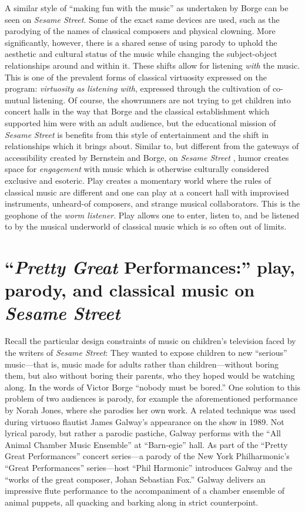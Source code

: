 \documentclass[12pt,letterpaper]{article}
\newcommand{\ses}{\textit{Sesame Street }}
\begin{document}
	A similar style of ``making fun with the music'' as undertaken by 
	Borge can be seen on \textit{Sesame Street}. Some of the exact same 
	devices are used, such as the parodying of the names of classical 
	composers and physical clowning. More significantly, however, there is 
	a shared sense of using
	parody to uphold the aesthetic and cultural status of the music while
	changing the subject-object relationships around and within it. 
	These shifts allow for listening \textit{with} the music. This is one
	of the prevalent forms
	of classical virtuosity expressed on the program: \textit{virtuosity as 
	listening with}, expressed through the cultivation of co-mutual
	listening. Of course, the showrunners are not trying to
	get children into concert halls in the way that Borge and the
	classical establishment which supported him were with an adult 
	audience, but the educational mission of \ses
	is benefits from this style of entertainment and the shift in 
	relationships which it brings about. Similar to, but different from the
	gateways of
	accessibility created by Bernstein and Borge, on \ses, humor creates 
	space for \textit{engagement} with music which is otherwise culturally
	considered exclusive and esoteric. Play creates a momentary world 
	where the rules of classical music are different and one can play 
	at a concert hall with improvised instruments, unheard-of composers,
	and strange musical collaborators. This is the geophone of the
	\textit{worm listener}. Play allows one to enter, listen to, and be 
	listened to by the musical underworld of classical music which is so 
	often out of limits.

	\section*{``\textit{Pretty Great} Performances:'' play, parody, and 
	classical music on \ses}

	Recall the particular design constraints of music on children's
	television faced by the writers of \textit{Sesame Street}: 	
	They wanted to expose children to new ``serious'' music---that is, music
	made for adults rather than children---without boring
	them, but also without boring their parents, who they hoped would be 
	watching along. In the words of Victor Borge ``nobody must
	be bored.'' One solution to this problem of two audiences is parody,
	for example the aforementioned performance by Norah Jones, where she
	parodies her own work. A related technique was used during virtuoso 
	flautist James Galway's appearance on the show in 1989. Not lyrical 
	parody, but rather a parodic pastiche, Galway performs with the ``All 
	Animal Chamber Music Ensemble'' at ``Barn-egie'' hall. As part of the 
	``Pretty Great Performances'' concert series---a parody of the New York
	Philharmonic's ``Great Performances'' series---host ``Phil Harmonic'' 
	introduces Galway and the ``works of the great composer, Johan Sebastian
	Fox.'' Galway delivers an impressive flute 
	performance to the accompaniment of a chamber ensemble of animal 
	puppets, all quacking and barking along in strict 
	counterpoint.\autocite{Galway2}
\end{document}
